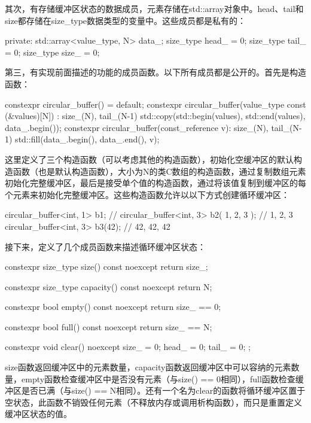 其次，有存储缓冲区状态的数据成员，元素存储在std::array对象中。head、tail和size都存储在size\_type数据类型的变量中。这些成员都是私有的：

\begin{cpp}
private:
	std::array<value_type, N> data_;
	size_type head_ = 0;
	size_type tail_ = 0;
	size_type size_ = 0;
\end{cpp}

第三，有实现前面描述的功能的成员函数。以下所有成员都是公开的。首先是构造函数：

\begin{cpp}
constexpr circular_buffer() = default;
constexpr circular_buffer(value_type const (&values)[N]) :
	size_(N), tail_(N-1)
{
	std::copy(std::begin(values), std::end(values),
	data_.begin());
}
constexpr circular_buffer(const_reference v):
	size_(N), tail_(N-1)
{
	std::fill(data_.begin(), data_.end(), v);
}
\end{cpp}

这里定义了三个构造函数（可以考虑其他的构造函数），初始化空缓冲区的默认构造函数（也是默认构造函数），大小为N的类C数组的构造函数，通过复制数组元素初始化完整缓冲区，最后是接受单个值的构造函数，通过将该值复制到缓冲区的每个元素来初始化完整缓冲区。这些构造函数允许以以下方式创建循环缓冲区：

\begin{cpp}
circular_buffer<int, 1> b1; // {}
circular_buffer<int, 3> b2({ 1, 2, 3 }); // {1, 2, 3}
circular_buffer<int, 3> b3(42); // {42, 42, 42}
\end{cpp}

接下来，定义了几个成员函数来描述循环缓冲区状态：

\begin{cpp}
constexpr size_type size() const noexcept
{ return size_; }

constexpr size_type capacity() const noexcept
{ return N; }

constexpr bool empty() const noexcept
{ return size_ == 0; }

constexpr bool full() const noexcept
{ return size_ == N; }

constexpr void clear() noexcept
{ size_ = 0; head_ = 0; tail_ = 0; };
\end{cpp}

size函数返回缓冲区中的元素数量，capacity函数返回缓冲区中可以容纳的元素数量，empty函数检查缓冲区中是否没有元素（与size() == 0相同），full函数检查缓冲区是否已满（与size() == N相同）。还有一个名为clear的函数将循环缓冲区置于空状态，此函数不销毁任何元素（不释放内存或调用析构函数），而只是重置定义缓冲区状态的值。

